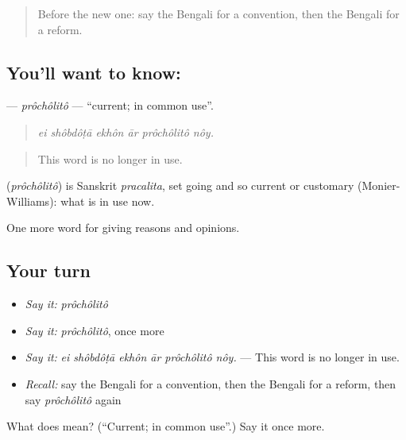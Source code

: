 \begin{quote}
Before the new one: say the Bengali for a convention, then the Bengali for a reform.
\end{quote}

\subsection*{You'll want to know: }
\textbf{} — \emph{prôchôlitô} — \textquotedblleft{}current; in common use\textquotedblright{}.

\begin{quote}
     
\end{quote}

\begin{quote}
\emph{ei shôbdôṭā ekhôn ār prôchôlitô nôy.}
\end{quote}

\begin{quote}
This word is no longer in use.
\end{quote}

\begin{cousinweb}
\textbf{} (\emph{prôchôlitô}) is Sanskrit \emph{pracalita}, set going and so current or customary (Monier-Williams): what is in use now.
\end{cousinweb}

\begin{grammarlens}[title={What you've built}]
One more word for giving reasons and opinions.
\end{grammarlens}

\subsection*{Your turn}
\begin{itemize}
\raggedright
  \item \emph{Say it:} \emph{prôchôlitô}
  \item \emph{Say it:} \emph{prôchôlitô}, once more
  \item \emph{Say it:} \emph{ei shôbdôṭā ekhôn ār prôchôlitô nôy.} — This word is no longer in use.
  \item \emph{Recall:} say the Bengali for a convention, then the Bengali for a reform, then say \emph{prôchôlitô} again
\end{itemize}

\begin{tcolorbox}[breakable,colback=teal!4,colframe=teal!35!black,title={Before you move on}]
What does  mean? (\textquotedblleft{}Current; in common use\textquotedblright{}.) Say it once more.
\end{tcolorbox}
